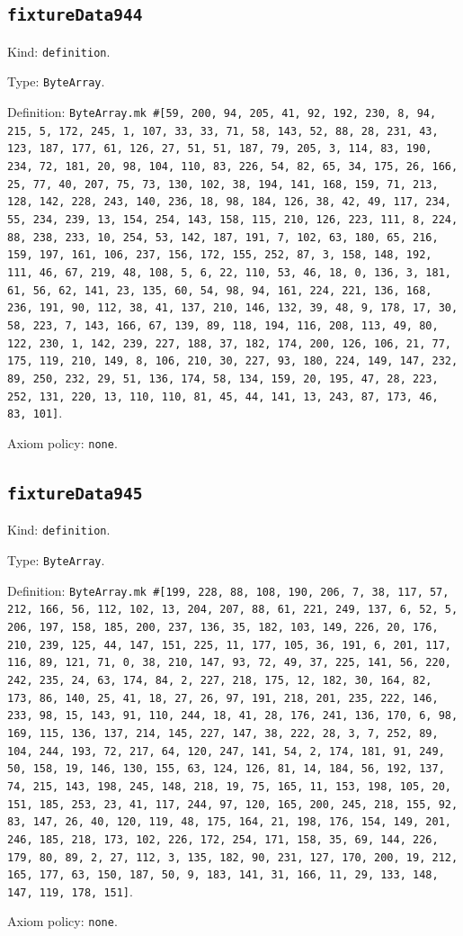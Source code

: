 \documentclass[11pt]{article}
\begin{document}
\subsection*{\texttt{fixtureData944}}
\noindent Kind: \texttt{definition}.\par
\noindent Type: \texttt{ByteArray}.\par
\noindent Definition: \texttt{ByteArray.mk \#[59, 200, 94, 205, 41, 92, 192, 230, 8, 94, 215, 5, 172, 245, 1, 107, 33, 33, 71, 58, 143, 52, 88, 28, 231, 43, 123, 187, 177, 61, 126, 27, 51, 51, 187, 79, 205, 3, 114, 83, 190, 234, 72, 181, 20, 98, 104, 110, 83, 226, 54, 82, 65, 34, 175, 26, 166, 25, 77, 40, 207, 75, 73, 130, 102, 38, 194, 141, 168, 159, 71, 213, 128, 142, 228, 243, 140, 236, 18, 98, 184, 126, 38, 42, 49, 117, 234, 55, 234, 239, 13, 154, 254, 143, 158, 115, 210, 126, 223, 111, 8, 224, 88, 238, 233, 10, 254, 53, 142, 187, 191, 7, 102, 63, 180, 65, 216, 159, 197, 161, 106, 237, 156, 172, 155, 252, 87, 3, 158, 148, 192, 111, 46, 67, 219, 48, 108, 5, 6, 22, 110, 53, 46, 18, 0, 136, 3, 181, 61, 56, 62, 141, 23, 135, 60, 54, 98, 94, 161, 224, 221, 136, 168, 236, 191, 90, 112, 38, 41, 137, 210, 146, 132, 39, 48, 9, 178, 17, 30, 58, 223, 7, 143, 166, 67, 139, 89, 118, 194, 116, 208, 113, 49, 80, 122, 230, 1, 142, 239, 227, 188, 37, 182, 174, 200, 126, 106, 21, 77, 175, 119, 210, 149, 8, 106, 210, 30, 227, 93, 180, 224, 149, 147, 232, 89, 250, 232, 29, 51, 136, 174, 58, 134, 159, 20, 195, 47, 28, 223, 252, 131, 220, 13, 110, 110, 81, 45, 44, 141, 13, 243, 87, 173, 46, 83, 101]}.\par
\noindent Axiom policy: \texttt{none}.\par
\subsection*{\texttt{fixtureData945}}
\noindent Kind: \texttt{definition}.\par
\noindent Type: \texttt{ByteArray}.\par
\noindent Definition: \texttt{ByteArray.mk \#[199, 228, 88, 108, 190, 206, 7, 38, 117, 57, 212, 166, 56, 112, 102, 13, 204, 207, 88, 61, 221, 249, 137, 6, 52, 5, 206, 197, 158, 185, 200, 237, 136, 35, 182, 103, 149, 226, 20, 176, 210, 239, 125, 44, 147, 151, 225, 11, 177, 105, 36, 191, 6, 201, 117, 116, 89, 121, 71, 0, 38, 210, 147, 93, 72, 49, 37, 225, 141, 56, 220, 242, 235, 24, 63, 174, 84, 2, 227, 218, 175, 12, 182, 30, 164, 82, 173, 86, 140, 25, 41, 18, 27, 26, 97, 191, 218, 201, 235, 222, 146, 233, 98, 15, 143, 91, 110, 244, 18, 41, 28, 176, 241, 136, 170, 6, 98, 169, 115, 136, 137, 214, 145, 227, 147, 38, 222, 28, 3, 7, 252, 89, 104, 244, 193, 72, 217, 64, 120, 247, 141, 54, 2, 174, 181, 91, 249, 50, 158, 19, 146, 130, 155, 63, 124, 126, 81, 14, 184, 56, 192, 137, 74, 215, 143, 198, 245, 148, 218, 19, 75, 165, 11, 153, 198, 105, 20, 151, 185, 253, 23, 41, 117, 244, 97, 120, 165, 200, 245, 218, 155, 92, 83, 147, 26, 40, 120, 119, 48, 175, 164, 21, 198, 176, 154, 149, 201, 246, 185, 218, 173, 102, 226, 172, 254, 171, 158, 35, 69, 144, 226, 179, 80, 89, 2, 27, 112, 3, 135, 182, 90, 231, 127, 170, 200, 19, 212, 165, 177, 63, 150, 187, 50, 9, 183, 141, 31, 166, 11, 29, 133, 148, 147, 119, 178, 151]}.\par
\noindent Axiom policy: \texttt{none}.\par
\end{document}
